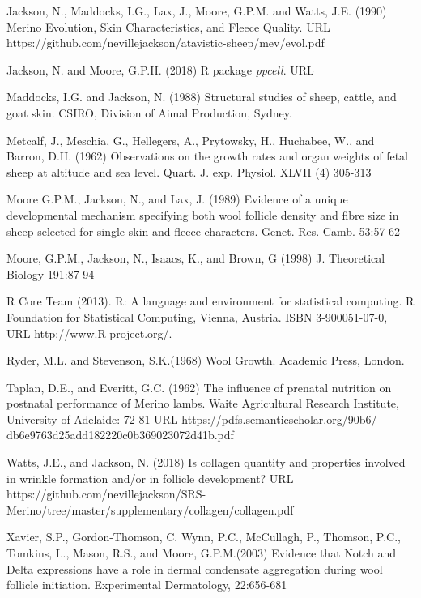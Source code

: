\documentclass[titlepage]{article}  %
\begin{document}
\begin{thebibliography}{99}
Jackson, N., Maddocks, I.G., Lax, J., Moore, G.P.M. and Watts, J.E. (1990) Merino Evolution, Skin Characteristics, and Fleece Quality. URL https://github.com/nevillejackson/atavistic-sheep/mev/evol.pdf 

Jackson, N. and Moore, G.P.H. (2018) R package {\em ppcell}. URL

Maddocks, I.G. and Jackson, N. (1988) Structural studies of sheep, cattle, and goat skin. CSIRO, Division of Aimal Production, Sydney.

Metcalf, J., Meschia, G., Hellegers, A., Prytowsky, H., Huchabee, W., and Barron, D.H. (1962) Observations on the growth rates and organ weights of fetal sheep at altitude and sea level. Quart. J. exp. Physiol. XLVII (4) 305-313

Moore G.P.M., Jackson, N., and Lax, J. (1989) Evidence of a unique developmental mechanism specifying both wool follicle density and fibre size in sheep selected for single skin and fleece characters. Genet. Res. Camb. 53:57-62

Moore, G.P.M., Jackson, N., Isaacs, K., and Brown, G (1998) J. Theoretical Biology 191:87-94

R Core Team (2013). R: A language and environment for statistical
  computing. R Foundation for Statistical Computing, Vienna, Austria.
  ISBN 3-900051-07-0, URL http://www.R-project.org/.

Ryder, M.L. and Stevenson, S.K.(1968) Wool Growth. Academic Press, London.

Taplan, D.E., and Everitt, G.C. (1962) The influence of prenatal nutrition on postnatal performance of Merino lambs. Waite Agricultural Research Institute, University of Adelaide: 72-81
URL https://pdfs.semanticscholar.org/90b6/
db6e9763d25add182220c0b369023072d41b.pdf

Watts, J.E., and Jackson, N. (2018) Is collagen quantity and properties involved in wrinkle formation and/or in follicle development? URL https://github.com/nevillejackson/SRS-Merino/tree/master/supplementary/collagen/collagen.pdf

Xavier, S.P., Gordon-Thomson, C. Wynn, P.C., McCullagh, P., Thomson, P.C., Tomkins, L., Mason, R.S., and Moore, G.P.M.(2003) Evidence that Notch and Delta expressions have a role in dermal condensate aggregation during wool follicle initiation. Experimental Dermatology, 22:656-681

\end{thebibliography}
\end{document}
